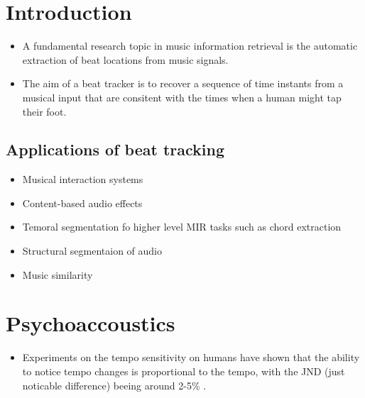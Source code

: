 \documentclass{article}
\begin{document}
\section{Introduction}

\begin{itemize}
\item A fundamental research topic in music information retrieval is the automatic extraction of beat locations from music signals. 
\item The aim of a beat tracker is to recover a sequence of time instants from a musical input that are consitent with the times when a human might tap their foot. \cite{Ellis2007}
\end{itemize}


\subsection{Applications of beat tracking}

\begin{itemize}
\item Musical interaction systems \cite{Robertson2007}
\item Content-based audio effects 
\item Temoral segmentation fo higher level MIR tasks such as chord extraction
\item Structural segmentaion of audio
\item Music similarity
\end{itemize}


\section{Psychoaccoustics}

\begin{itemize}
\item Experiments on the tempo sensitivity on humans have shown that the ability to notice tempo changes is proportional to the tempo, with the JND (just noticable difference) beeing around 2-5\% \cite{Drake1993}.
\end{itemize}
\end{document}
